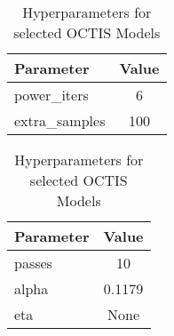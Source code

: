 \begin{table}[H]
    \centering
    \caption{Hyperparameters for selected OCTIS Models}
    
    \begin{minipage}{.5\linewidth}
        \centering
        \begin{tabular}{lc}
            \toprule
            Parameter & Value \\
            \midrule
            power\_iters & 6 \\
            extra\_samples & 100 \\
            \bottomrule
        \end{tabular}
    \end{minipage}%
    \begin{minipage}{.5\linewidth}
        \centering
        \begin{tabular}{lc}
            \toprule
            Parameter & Value \\
            \midrule
            passes & 10 \\
            alpha & 0.1179 \\
            eta & None \\
            \bottomrule
        \end{tabular}
    \end{minipage}
    

\end{table}
